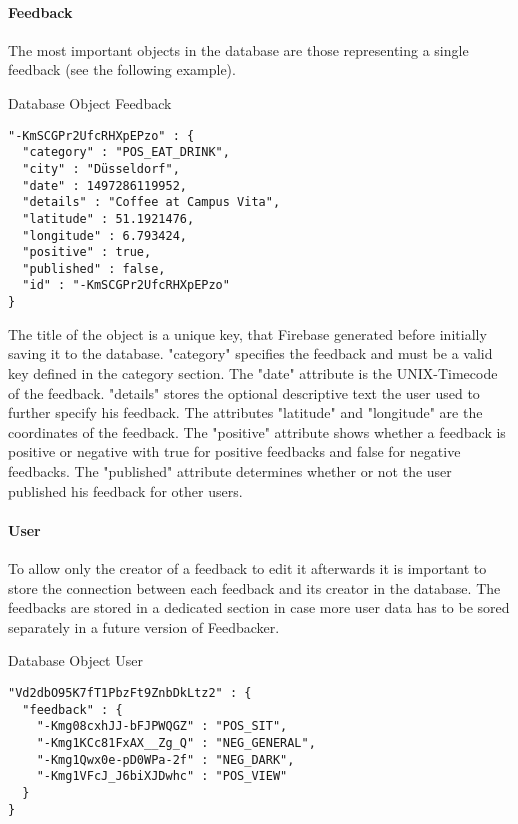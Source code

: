 \paragraph{Feedback}
The most important objects in the database are those representing a single feedback (see the following example).
\begin{listing}[H]
  \caption{Database Object Feedback}
  \label{mint:db_feedback}
  \begin{verbatim}
"-KmSCGPr2UfcRHXpEPzo" : {
  "category" : "POS_EAT_DRINK",
  "city" : "Düsseldorf",
  "date" : 1497286119952,
  "details" : "Coffee at Campus Vita",
  "latitude" : 51.1921476,
  "longitude" : 6.793424,
  "positive" : true,
  "published" : false,
  "id" : "-KmSCGPr2UfcRHXpEPzo"
}
  \end{verbatim}
\end{listing}
The title of the object is a unique key, that Firebase generated before initially saving it to the database. "category" specifies the feedback and must be a valid key defined in the category section. The "date" attribute is the UNIX-Timecode of the feedback. "details" stores the optional descriptive text the user used to further specify his feedback. The attributes "latitude" and "longitude" are the coordinates of the feedback. The "positive" attribute shows whether a feedback is positive or negative with true for positive feedbacks and false for negative feedbacks. The "published" attribute determines whether or not the user published his feedback for other users.

\paragraph{User}
To allow only the creator of a feedback to edit it afterwards it is important to store the connection between each feedback and its creator in the database. The feedbacks are stored in a dedicated section in case more user data has to be sored separately in a future version of Feedbacker.
\begin{listing}[H]
\caption{Database Object User}
\label{mint:db_user}
\begin{verbatim}
"Vd2dbO95K7fT1PbzFt9ZnbDkLtz2" : {
  "feedback" : {
    "-Kmg08cxhJJ-bFJPWQGZ" : "POS_SIT",
    "-Kmg1KCc81FxAX__Zg_Q" : "NEG_GENERAL",
    "-Kmg1Qwx0e-pD0WPa-2f" : "NEG_DARK",
    "-Kmg1VFcJ_J6biXJDwhc" : "POS_VIEW"
  }
}
    \end{verbatim}
\end{listing}

